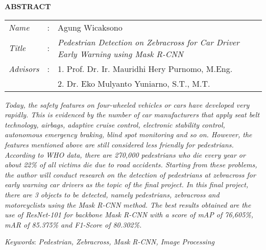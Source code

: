 \begin{center}
  \large\textbf{ABSTRACT}
\end{center}


\vspace{2ex}

\begingroup
  \setlength{\tabcolsep}{0pt}

  \noindent
  \begin{tabularx}{\textwidth}{l >{\centering}m{3em} X}
    \emph{Name}     &:& Agung Wicaksono \\

    \emph{Title}    &:& \emph{Pedestrian Detection on \textit{Zebracross} for Car Driver Early Warning using \textit{Mask R-CNN}} \\

    \emph{Advisors}  &:& 1. Prof. Dr. Ir. Mauridhi Hery Purnomo, M.Eng. \\
    				 & & 2. Dr. Eko Mulyanto Yuniarno, S.T., M.T. \\
  \end{tabularx}
\endgroup

\emph{Today, the safety features on four-wheeled vehicles or cars have developed very rapidly. This is evidenced by the number of car manufacturers that apply seat belt technology, airbags, adaptive cruise control, electronic stability control, autonomous emergency braking, blind spot monitoring and so on. However, the features mentioned above are still considered less friendly for pedestrians. According to WHO data, there are 270,000 pedestrians who die every year or about 22\% of all victims die due to road accidents. Starting from these problems, the author will conduct research on the detection of pedestrians at zebracross for early warning car drivers as the topic of the final project. In this final project, there are 3 objects to be detected, namely pedestrians, zebracross and motorcyclists using the Mask R-CNN method. The best results obtained are the use of \textit{ResNet-101} for \textit{backbone Mask R-CNN} with a score of \textit{mAP} of 76,605\%, mAR of 85.375\% and \textit{F1-Score} of 80.302\%.}

\emph{Keywords}: \emph{Pedestrian, Zebracross, Mask R-CNN, Image Processing}
